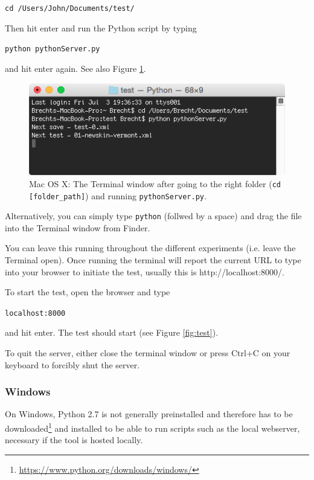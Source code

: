 \documentclass[11pt, oneside]{article}   	%
\begin{document}
				\texttt{cd /Users/John/Documents/test/}
				
			Then hit enter and run the Python script by typing

				\texttt{python pythonServer.py}

			and hit enter again. See also Figure \ref{fig:terminal}.
			
			\begin{figure}[htbp]
	                \begin{center}
	                \includegraphics[width=.75\textwidth]{pythonServer.png}
	                \caption{Mac OS X: The Terminal window after going to the right folder (\texttt{cd [folder\_path]}) and running \texttt{pythonServer.py}.}
	                \label{fig:terminal}
	                \end{center}
	                \end{figure}

	        Alternatively, you can simply type \texttt{python} (follwed by a space) and drag the file into the Terminal window from Finder. %
			
			You can leave this running throughout the different experiments (i.e. leave the Terminal open). Once running the terminal will report the current URL to type into your browser to initiate the test, usually this is http://localhost:8000/.

			To start the test, open the browser and type 
				
			\texttt{localhost:8000}

			and hit enter. The test should start (see Figure \ref{fig:test}). 

			To quit the server, either close the terminal window or press Ctrl+C on your keyboard to forcibly shut the server.

		\subsubsection{Windows}

			On Windows, Python 2.7 is not generally preinstalled and therefore has to be downloaded\footnote{\url{https://www.python.org/downloads/windows/}} and installed to be able to run scripts such as the local webserver, necessary if the tool is hosted locally. 
		
\end{document}
